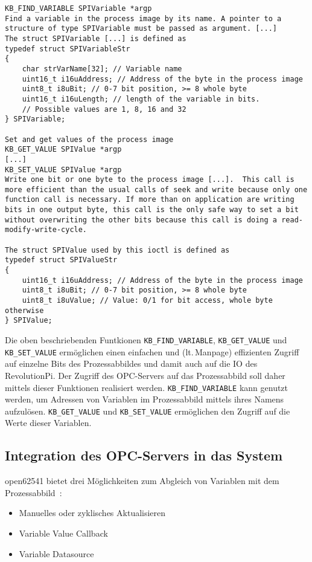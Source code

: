 \begin{lstlisting}[breakindent=0pt, numbers=none, caption={Auszug aus der Revolution Pi Programmers Manual\label{lst:4-manpage}}]
KB_FIND_VARIABLE SPIVariable *argp
Find a variable in the process image by its name. A pointer to a structure of type SPIVariable must be passed as argument. [...]
The struct SPIVariable [...] is defined as 
typedef struct SPIVariableStr
{
    char strVarName[32]; // Variable name
    uint16_t i16uAddress; // Address of the byte in the process image
    uint8_t i8uBit; // 0-7 bit position, >= 8 whole byte
    uint16_t i16uLength; // length of the variable in bits.
    // Possible values are 1, 8, 16 and 32
} SPIVariable;

Set and get values of the process image
KB_GET_VALUE SPIValue *argp
[...]
KB_SET_VALUE SPIValue *argp
Write one bit or one byte to the process image [...].  This call is more efficient than the usual calls of seek and write because only one function call is necessary. If more than on application are writing bits in one output byte, this call is the only safe way to set a bit without overwriting the other bits because this call is doing a read-modify-write-cycle. 

The struct SPIValue used by this ioctl is defined as
typedef struct SPIValueStr
{
    uint16_t i16uAddress; // Address of the byte in the process image
    uint8_t i8uBit; // 0-7 bit position, >= 8 whole byte
    uint8_t i8uValue; // Value: 0/1 for bit access, whole byte otherwise
} SPIValue;
\end{lstlisting} 

Die oben beschriebenden Funtkionen \lstinline{KB_FIND_VARIABLE}, \lstinline{KB_GET_VALUE} und \lstinline{KB_SET_VALUE} ermöglichen einen einfachen und (lt.\,Manpage) effizienten Zugriff auf einzelne Bits des Prozessabbildes und damit auch auf die IO des RevolutionPi.
Der Zugriff des OPC-Servers auf das Prozessabbild soll daher mittels dieser Funktionen realisiert werden.
\lstinline{KB_FIND_VARIABLE} kann genutzt werden, um Adressen von Variablen im Prozessabbild mittels ihres Namens aufzulösen.
\lstinline{KB_GET_VALUE} und \lstinline{KB_SET_VALUE} ermöglichen den Zugriff auf die Werte dieser Variablen.


\subsection{Integration des OPC-Servers in das System%
     \label{sec:3-integration}}

open62541 bietet drei Möglichkeiten zum Abgleich von Variablen mit dem Prozessabbild~\citep[vgl.][Tutorials - Connecting a Variable with a Physical Process]{web-open62541}:
\begin{itemize}
    \item Manuelles oder zyklisches Aktualisieren
    \item Variable Value Callback
    \item Variable Datasource
\end{itemize}


